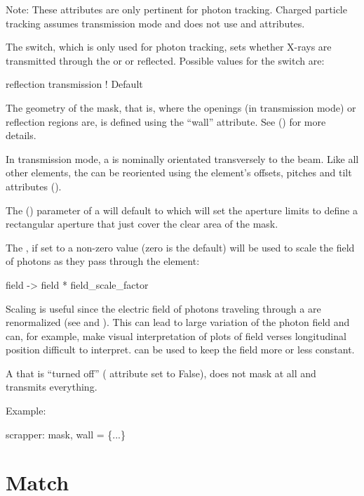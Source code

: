 {Note: These attributes are only pertinent for photon tracking. Charged
particle tracking assumes transmission mode and does not use
 and  attributes.

The  switch, which is only used for photon tracking, sets
whether X-rays are transmitted through the  or
or reflected. Possible values for the  switch are:
\begin{example}
  reflection
  transmission        ! Default
\end{example}

The geometry of the mask, that is, where the openings (in
transmission mode) or reflection regions are, is defined using the
``wall'' attribute. See () for more details.

In transmission mode, a  is nominally orientated
transversely to the beam. Like all other elements, the
 can be reoriented using the element's offsets,
pitches and tilt attributes ().

The  () parameter of a
 will default to  which will set the
aperture limits to define a rectangular aperture that just cover the
clear area of the mask.

The , if set to a non-zero value (zero is the
default) will be used to scale the field of photons as they pass through
the  element:
\begin{example}
  field -> field * field_scale_factor
\end{example}
Scaling is useful since the electric field of photons traveling through a
 are renormalized (see  and
). This can lead to large variation of the photon field and
can, for example, make visual interpretation of plots of field verses
longitudinal position difficult to interpret. 
can be used to keep the field more or less constant.

A  that is ``turned off'' ( attribute set to
False), does not mask at all and transmits everything.

Example:
\begin{example}
  scrapper: mask, wall = \{...\}
\end{example}

\section{Match}
\label{s:match}

}
